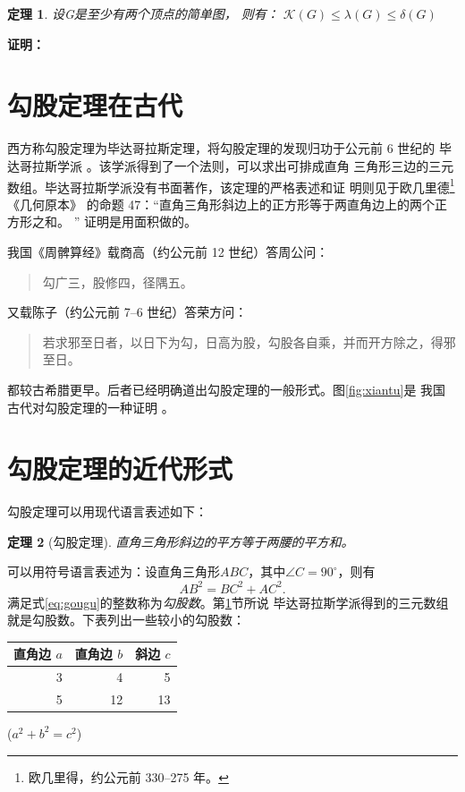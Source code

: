 \documentclass[UTF8]{ctexart}
\newenvironment{myquote}
{\begin{quote}\kaishu\zihao{-5}}
{\end{quote}}
\newcommand\degree{^\circ}
\newtheorem{thm}{定理}
\begin{document}
    \begin{thm}
    设G是至少有两个顶点的简单图，
    则有：
    $ \mathcal{K}(G)  \leq \lambda(G)  \leq \delta(G)$
    \end{thm}
    
    \textbf{证明：}
    
    
    \tableofcontents
    \section{勾股定理在古代}\label{sec:diyijie}
    西方称勾股定理为毕达哥拉斯定理，将勾股定理的发现归功于公元前 6 世纪的
    毕达哥拉斯学派 \cite{Kline}。该学派得到了一个法则，可以求出可排成直角
    三角形三边的三元数组。毕达哥拉斯学派没有书面著作，该定理的严格表述和证
    明则见于欧几里德\footnote{欧几里得，约公元前 330--275 年。}《几何原本》
    的命题 47：“直角三角形斜边上的正方形等于两直角边上的两个正方形之和。 ” 
    证明是用面积做的。
    
    我国《周髀算经》载商高（约公元前 12 世纪）答周公问：
    \begin{myquote}
        勾广三，股修四，径隅五。
    \end{myquote}
    又载陈子（约公元前 7--6 世纪）答荣方问：
    \begin{myquote}
        若求邪至日者，以日下为勾，日高为股，勾股各自乘，并而开方除之，得邪至日。
    \end{myquote}
    都较古希腊更早。后者已经明确道出勾股定理的一般形式。图\ref{fig:xiantu}是
    我国古代对勾股定理的一种证明 \cite{quanjing}。
   
    \section{勾股定理的近代形式}
    勾股定理可以用现代语言表述如下：
    \begin{thm}[勾股定理]
        直角三角形斜边的平方等于两腰的平方和。
    \end{thm}

    可以用符号语言表述为：设直角三角形$ABC$，其中$\angle C = 90\degree$，则有
    \begin{equation}\label{eq:gougu}
    AB^2 = BC^2 + AC^2.
    \end{equation}
    满足式\eqref{eq:gougu}的整数称为\emph{勾股数}。第\ref{sec:diyijie}节所说
    毕达哥拉斯学派得到的三元数组就是勾股数。下表列出一些较小的勾股数：
    \begin{table}[H]
        \begin{tabular}{|rrr|}
            \hline
            直角边 $a$ & 直角边 $b$ & 斜边 $c$ \\
            \hline
            3 & 4 & 5 \\
            5 & 12 & 13 \\
            \hline
        \end{tabular}%
        \qquad
        ($a^2 + b^2 = c^2$)
    \end{table}
    \nocite{Shiye}
    
\end{document}
